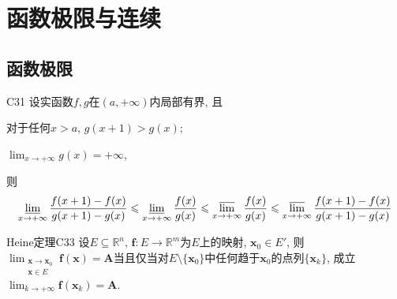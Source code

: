 \chapter{函数极限与连续}
\section{函数极限}
\begin{proposition}{}{C31}
    设实函数\(f,g\)在\((a,+\infty)\)内局部有界, 且\begin{compactenum}[(i)]
        \item 对于任何\(x>a\), \(g(x+1)>g(x)\);
        \item \(\lim_{x\rightarrow+\infty}g(x)=+\infty\),
    \end{compactenum}则\[\varliminf_{x\rightarrow+\infty}\frac{f(x+1)-f(x)}{g(x+1)-g(x)}\leqslant\varliminf_{x\rightarrow+\infty}\frac{f(x)}{g(x)}\leqslant\varlimsup_{x\rightarrow+\infty}\frac{f(x)}{g(x)}\leqslant\varlimsup_{x\rightarrow+\infty}\frac{f(x+1)-f(x)}{g(x+1)-g(x)}\]
\end{proposition}
\begin{theorem}{Heine定理}{C33}
设\(E\subseteq\mathbb{R}^n\), \(\boldsymbol{f}:E\rightarrow\mathbb{R}^m\)为\(E\)上的映射, \(\boldsymbol{x}_0\in E'\), 则 \(\lim_{\substack{\boldsymbol{x}\rightarrow\boldsymbol{x}_0\\\boldsymbol{x}\in E}}\boldsymbol{f}(\boldsymbol{x})=\boldsymbol{A}\)当且仅当对\(E\setminus\{\boldsymbol{x}_0\}\)中任何趋于\(\boldsymbol{x}_0\)的点列\(\{\boldsymbol{x}_k\}\), 成立\(\lim_{k\rightarrow+\infty}\boldsymbol{f}(\boldsymbol{x}_k)=\boldsymbol{A}\).
\end{theorem}
